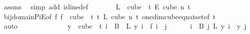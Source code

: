 \begin{isabellebody}
\ assms{\isacharparenleft}{\kern0pt}{}{\isacharparenright}{\kern0pt}\ \isamarkupfalse%
\ {\isacharparenleft}{\kern0pt}simp\ add{\isacharcolon}{\kern0pt}\ is{\isacharunderscore}{\kern0pt}line{\isacharunderscore}{\kern0pt}def{\isacharparenright}{\kern0pt}\isanewline
\ \ \ \ \isamarkupfalse%
\ \isamarkupfalse%
\ {\isachardoublequoteopen}{\isacharquery}{\kern0pt}L\ {\isasymin}\ {\isacharparenleft}{\kern0pt}cube\ {}\ t{\isacharparenright}{\kern0pt}\ {\isasymrightarrow}\isactrlsub E\ {\isacharparenleft}{\kern0pt}cube\ n\ t{\isacharparenright}{\kern0pt}{\isachardoublequoteclose}\isanewline
\ \ \ \ \ \ \isamarkupfalse%
\ bij{\isacharunderscore}{\kern0pt}domain{\isacharunderscore}{\kern0pt}PiE{\isacharbrackleft}{\kern0pt}of\ {\isachardoublequoteopen}{\isacharparenleft}{\kern0pt}{\isasymlambda}f{\isachardot}{\kern0pt}\ f\ {}{\isacharparenright}{\kern0pt}{\isachardoublequoteclose}\ {\isachardoublequoteopen}{\isacharparenleft}{\kern0pt}cube\ {}\ t{\isacharparenright}{\kern0pt}{\isachardoublequoteclose}\ {\isachardoublequoteopen}{\isacharbraceleft}{\kern0pt}{\isachardot}{\kern0pt}{\isachardot}{\kern0pt}{\isacharless}{\kern0pt}t{\isacharbraceright}{\kern0pt}{\isachardoublequoteclose}\ {\isachardoublequoteopen}L{\isachardoublequoteclose}\ {\isachardoublequoteopen}cube\ n\ t{\isachardoublequoteclose}{\isacharbrackright}{\kern0pt}\ one{\isacharunderscore}{\kern0pt}dim{\isacharunderscore}{\kern0pt}cube{\isacharunderscore}{\kern0pt}eq{\isacharunderscore}{\kern0pt}nat{\isacharunderscore}{\kern0pt}set{\isacharbrackleft}{\kern0pt}of\ {\isachardoublequoteopen}t{\isachardoublequoteclose}{\isacharbrackright}{\kern0pt}\ \isanewline
\ \ \ \ \ \ \isamarkupfalse%
\ auto\isanewline
\ \ \isacommand{{\isacharbraceright}{\kern0pt}}\isamarkupfalse%
\isanewline
\ \ \isamarkupfalse%
\isanewline
\ \ \isacommand{{\isacharbraceleft}{\kern0pt}}\isamarkupfalse%
\isanewline
\ \ \ \ \isamarkupfalse%
\ {\isachardoublequoteopen}{\isasymforall}y\ {\isasymin}\ cube\ {}\ t{\isachardot}{\kern0pt}\ {\isacharparenleft}{\kern0pt}{\isasymforall}i\ {\isasymin}\ B\ {}{\isachardot}{\kern0pt}\ {\isacharquery}{\kern0pt}L\ y\ i\ {\isacharequal}{\kern0pt}\ {\isacharquery}{\kern0pt}f\ i{\isacharparenright}{\kern0pt}\ {\isasymand}\ {\isacharparenleft}{\kern0pt}{\isasymforall}j\ {\isacharless}{\kern0pt}\ {}{\isachardot}{\kern0pt}\isanewline
\ \ \ \ {\isasymforall}i\ {\isasymin}\ B\ j{\isachardot}{\kern0pt}\ {\isacharparenleft}{\kern0pt}{\isacharquery}{\kern0pt}L\ y{\isacharparenright}{\kern0pt}\ i\ {\isacharequal}{\kern0pt}\ y\ j{\isacharparenright}{\kern0pt}{\isachardoublequoteclose}\isanewline

\end{isabellebody}
